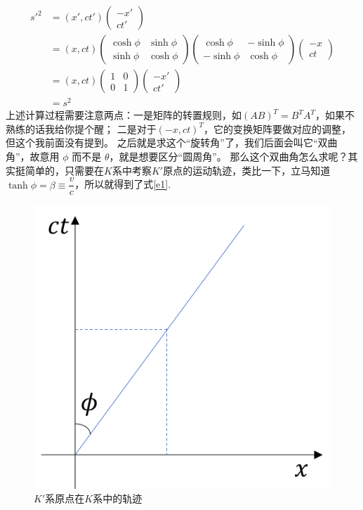 \documentclass[12pt, a4paper, oneside]{ctexbook}
\begin{document}
\begin{equation}\begin{split}
	s'^{2}&=(x',ct')\begin{pmatrix}-x'\\ct'\end{pmatrix}\\
	&=
	(x,ct)
	\begin{pmatrix}
		\cosh\phi & \sinh\phi \\
		\sinh\phi & \cosh\phi
	\end{pmatrix}
	\begin{pmatrix}
		\cosh\phi & -\sinh\phi \\
		-\sinh\phi & \cosh\phi
	\end{pmatrix}\begin{pmatrix}-x\\ct\end{pmatrix}\\
	&=(x,ct)\begin{pmatrix}
		1 & 0 \\
		0 & 1
	\end{pmatrix}
	\begin{pmatrix}-x'\\ct'\end{pmatrix}\\
	&=s^{2}
\end{split}\end{equation}
上述计算过程需要注意两点：一是矩阵的转置规则，如$(AB)^{T}=B^{T}A^{T}$，如果不熟练的话我给你提个醒；
二是对于$(-x,ct)^{T}$，它的变换矩阵要做对应的调整，但这个我前面没有提到。
之后就是求这个“旋转角”了，我们后面会叫它“双曲角”，故意用 $\phi$ 而不是 $\theta$，就是想要区分“圆周角”。
那么这个双曲角怎么求呢？其实挺简单的，只需要在$K$系中考察$K'$原点的运动轨迹，类比一下，立马知道$\tanh\phi=\beta\equiv\dfrac{v}{c}$，所以就得到了式\eqref{e1}.\par   
\begin{figure}[H]
	\centering
	\includegraphics[scale=0.5]{figures/tanh_phi.png}
	\caption{$K'$系原点在$K$系中的轨迹}
\end{figure}
\end{document}
